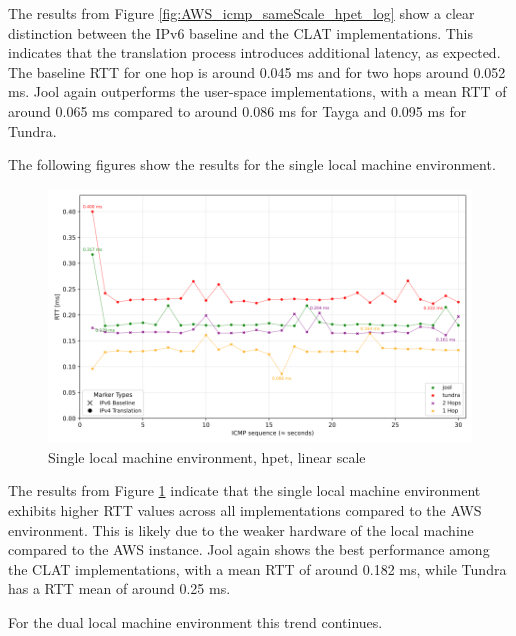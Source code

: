 The results from Figure \ref{fig:AWS_icmp_sameScale_hpet_log} show a clear distinction between the IPv6 baseline and the CLAT implementations. 
This indicates that the translation process introduces additional latency, as expected.
The baseline RTT for one hop is around 0.045 ms and for two hops around 0.052 ms.
Jool again outperforms the user-space implementations, with a mean RTT of around 0.065 ms compared to around 0.086 ms for Tayga and 0.095 ms for Tundra.

The following figures show the results for the single local machine environment.

\begin{figure}[H]
    \centering
    \includegraphics[width=1\textwidth]{resources/plots/CombinedPlot/RTT/Single_ping_rtt_Ping_30s_linear.png}
    \caption{Single local machine environment, hpet, linear scale}
    \label{fig:Local_icmp_sameScale_hpet_linear}
\end{figure}

The results from Figure \ref{fig:Local_icmp_sameScale_hpet_linear} indicate that the single local machine environment exhibits higher RTT values across all implementations compared to the AWS environment.
This is likely due to the weaker hardware of the local machine compared to the AWS instance.
Jool again shows the best performance among the CLAT implementations, with a mean RTT of around 0.182 ms, while Tundra has a RTT mean of around 0.25 ms.

For the dual local machine environment this trend continues.

